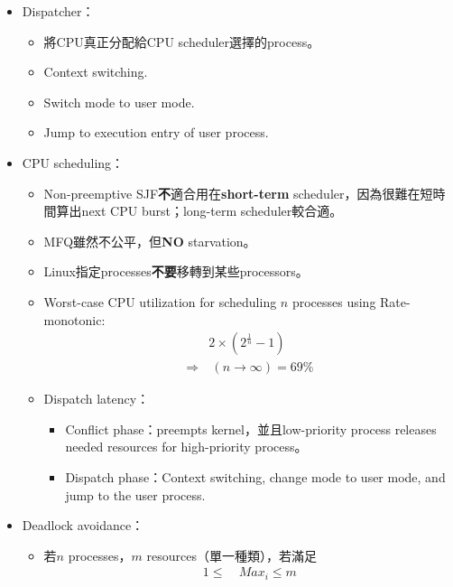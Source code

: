 \begin{itemize}
\begin{itemize}
    \end{itemize}
    \item Dispatcher： \begin{itemize}
        \item 將CPU真正分配給CPU scheduler選擇的process。
        \item Context switching.
        \item Switch mode to user mode.
        \item Jump to execution entry of user process.
    \end{itemize}
    \item CPU scheduling： \begin{itemize}
        \item Non-preemptive SJF\textbf{不}適合用在\textbf{short-term} scheduler，因為很難在短時間算出next CPU burst；long-term scheduler較合適。
        \item MFQ雖然不公平，但\textbf{NO} starvation。
        \item Linux指定processes\textbf{不要}移轉到某些processors。
        \item Worst-case CPU utilization for scheduling $n$ processes using Rate-monotonic: \begin{equation}
            \begin{aligned}
                & 2 \times (2^{\frac{1}{n}} - 1) \\
                \Rightarrow & \ (n \rightarrow \infty) = 69\%
            \end{aligned}
        \end{equation}
        \item Dispatch latency：\begin{itemize}
            \item Conflict phase：preempts kernel，並且low-priority process releases needed resources for high-priority process。
            \item Dispatch phase：Context switching, change mode to user mode, and jump to the user process.
        \end{itemize}
    \end{itemize}
    \item Deadlock avoidance：\begin{itemize}
        \item 若$n$ processes，$m$ resources（單一種類），若滿足\begin{equation} \label{eq:deadlock}
            \begin{aligned}
                1 \le \ & Max_i \le m \\

\end{aligned}
\end{equation}
\end{itemize}
\end{itemize}
